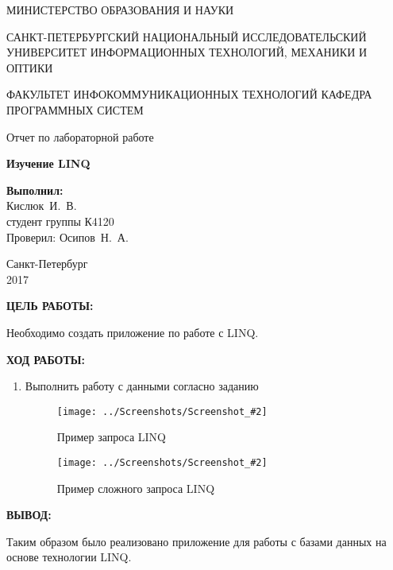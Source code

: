 \documentclass[14pt,a4paper]{extreport}
\newcommand{\screenshot}[2]{\begin{figure}[ht]%
\centering\texttt{[image: ../Screenshots/Screenshot\_\#2]}%
\caption{#1}%
\label{picture#2}%
\end{figure}%
}
\newcommand{\header}[1]{%
{
\fontsize{16pt}{14pt}\selectfont
\begin{center}
\textbf{\MakeUppercase{#1}:}
\end{center}
}
}
\newcommand{\osipov}{Осипов~Н.~А.}
\newcommand{\igork}{Кислюк~И.~В.}
\begin{document}
	\begin{titlepage}
	\begin{center}	
		\fontsize{14pt}{14pt}\selectfont
		МИНИСТЕРСТВО ОБРАЗОВАНИЯ И НАУКИ\\

		\vspace*{0.6\baselineskip}
		
		САНКТ-ПЕТЕРБУРГСКИЙ НАЦИОНАЛЬНЫЙ ИССЛЕДОВАТЕЛЬСКИЙ УНИВЕРСИТЕТ ИНФОРМАЦИОННЫХ ТЕХНОЛОГИЙ, МЕХАНИКИ И ОПТИКИ
		
		\vspace*{0.6\baselineskip}
		ФАКУЛЬТЕТ ИНФОКОММУНИКАЦИОННЫХ ТЕХНОЛОГИЙ
		КАФЕДРА ПРОГРАММНЫХ СИСТЕМ
	
		\vspace*{7\baselineskip}
		\fontsize{19pt}{18pt}\selectfont
		Отчет по лабораторной работе
		
		\fontsize{20pt}{18pt}\selectfont
		\textbf{Изучение LINQ}\\
		\vspace*{1.15\baselineskip}
		\end{center}
	
	\vspace*{2\baselineskip}
	\begin{flushright}
	\fontsize{14pt}{14pt}\selectfont
	\textbf{Выполнил:}\\
	\igork\\
	студент группы К4120\\
	Проверил: \osipov\\
	\end{flushright}
	
	\vspace{\fill}
	\begin{center}
	Санкт-Петербург\\
	2017
	\end{center}
	
\end{titlepage}

\newpage

\header{Цель работы}

\fontsize{14pt}{14pt}\selectfont

Необходимо создать приложение по работе с LINQ.

\clearpage

\header{Ход работы}

\begin{enumerate}

\item Выполнить работу с данными согласно заданию

\screenshot{Пример запроса LINQ}{3}
\screenshot{Пример сложного запроса LINQ}{9}

\end{enumerate}

\clearpage

\header{Вывод}

Таким образом было реализовано приложение для работы с базами данных на основе технологии LINQ.
\end{document}
